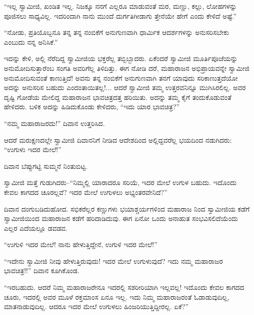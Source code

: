 “ಇಲ್ಲ ಸ್ವಾಮೀಜಿ, ಖಂಡಿತ ಇಲ್ಲ. ನಿಜಕ್ಕೂ ನನಗೆ ಎಲ್ಲರೂ ಮಾಡುವಂತೆ ಮರ, ಮಣ್ಣು, ಕಲ್ಲು, ಲೋಹಗಳನ್ನು ಪೂಜಿಸಲು ಸಾಧ್ಯವಿಲ್ಲ. ಇದರಿಂದಾಗಿ ನಾನು ಮುಂದೆ ದುರ್ಗತಿಗೀಡಾಗು ತ್ತೇನೆಯೇ ಹೇಗೆ ಎಂದು ಕೇಳಿದೆ ಅಷ್ಟೆ.”

“ನೋಡು, ಪ್ರತಿಯೊಬ್ಬನೂ ತನ್ನ ತನ್ನ ನಂಬಿಕೆಗೆ ಅನುಗುಣವಾಗಿ ಧಾರ್ಮಿಕ ಆದರ್ಶಗಳನ್ನು ಅನುಸರಿಸಬೇಕು ಎಂಬುದು ನನ್ನ ಅನಿಸಿಕೆ.”

ಇದನ್ನು ಕೇಳಿ, ಅಲ್ಲಿ ನೆರೆದಿದ್ದ ಸ್ವಾಮೀಜಿಯ ಭಕ್ತರೆಲ್ಲ ತಬ್ಬಿಬ್ಬಾದರು. ಏಕೆಂದರೆ ಸ್ವಾಮೀಜಿ ಮೂರ್ತಿಪೂಜೆಯನ್ನು ಅನುಮೋದಿಸುತ್ತಾರೆಂಬ ಸಂಗತಿ ಅವರಿಗೆಲ್ಲ ತಿಳಿದಿತ್ತು. ಈಗ ನೋಡಿ ದರೆ, ಮಹಾರಾಜನ ಅಭಿಪ್ರಾಯವನ್ನೇ ಸ್ವಾಮೀಜಿ ಅನುಮೋದಿಸುವಂತೆ ಕಾಣುತ್ತಿದೆ! ಅವನು ತನ್ನ ನಂಬಿಕೆಗೆ ಅನುಗುಣವಾಗಿ ತನಗೆ ಯಾವುದು ಸರಿಕಾಣುತ್ತದೆಯೋ ಅದನ್ನು ಅನುಸರಿಸ ಬಹುದು ಎಂದಂತಾಯಿತಲ್ಲ!... ಆದರೆ ಸ್ವಾಮೀಜಿ ತಮ್ಮ ಉತ್ತರವನಿನ್ನೂ ಮುಗಿಸಿರಲಿಲ್ಲ. ಅವರ ದೃಷ್ಟಿ ಗೋಡೆಯ ಮೇಲಿದ್ದ ಮಹಾರಾಜನ ಭಾವಚಿತ್ರದತ್ತ ಹರಿಯಿತು. ಅದನ್ನು ತಮ್ಮ ಕೈಗೆ ತಂದುಕೊಡುವಂತೆ ಹೇಳಿದರು. ಬಳಿಕ ಅದನ್ನು ಹಿಡಿದುಕೊಂಡು ಕೇಳಿದರು, “ಇದು ಯಾರ ಭಾವಚಿತ್ರ?”

“ನಮ್ಮ ಮಹಾರಾಜರದು!” ದಿವಾನ ಉತ್ತರಿಸಿದ.

ಆದರೆ ಮರುಕ್ಷಣದಲ್ಲೇ ಸ್ವಾಮೀಜಿ ದಿವಾನನಿಗೆ ನೀಡಿದ ಆದೇಶದಿಂದ ಅಲ್ಲಿದ್ದವರೆಲ್ಲ ಭಯದಿಂದ ನಡುಗಿದರು: “ಉಗುಳು ಇದರ ಮೇಲೆ!”

ದಿವಾನ ಬೆಪ್ಪುಗಟ್ಟಿ ಸುಮ್ಮನೆ ನಿಂತುಬಿಟ್ಟ.

ಸ್ವಾಮೀಜಿ ಮತ್ತೆ ಗುಡುಗಿದರು–“ನಿಮ್ಮಲ್ಲಿ ಯಾರಾದರೂ ಸರಿಯೆ, ಇದರ ಮೇಲೆ ಉಗುಳ ಬಹುದು. ಇದೊಂದು ಕೇವಲ ಕಾಗದದ ಚೂರಲ್ಲವೆ? ಇದರ ಮೇಲೆ ಉಗುಳಲು ಅಭ್ಯಂತರವೇನಿದೆ?”

ದಿವಾನ ದಂಗುಬಡಿದುಹೋದ. ಸಭಿಕರೆಲ್ಲರ ಕಣ್ಣುಗಳು ಭಯಾಶ್ಚರ್ಯಗಳಿಂದ ಮಹಾರಾಜ ನಿಂದ ಸ್ವಾಮೀಜಿಯ ಕಡೆಗೆ ಸ್ವಾಮೀಜಿಯಿಂದ ಮಹಾರಾಜನ ಕಡೆಗೆ ಹರಿದಾಡಿದುವು. ಈಗ ಏನೋ ಒಂದು ಅನಾಹುತ ಸಂಭವಿಸಲಿದೆಯೆಂದು ಎಲ್ಲರ ಎದೆಯಲ್ಲೂ ಡವಡವ.

“ಉಗುಳಿ ಇದರ ಮೇಲೆ! ನಾನು ಹೇಳುತ್ತಿದ್ದೇನೆ, ಉಗುಳಿ ಇದರ ಮೇಲೆ!”

“ಇದೇನು ಸ್ವಾಮೀಜಿ ನೀವು ಹೇಳುತ್ತಿರುವುದು! ಇದರ ಮೇಲೆ ಉಗುಳುವುದೆ? ಇದು ನಮ್ಮ ಮಹಾರಾಜರ ಭಾವಚಿತ್ರ!!” ದಿವಾನ ಕೂಗಿಕೊಂಡ.

“ಇರಬಹುದು. ಆದರೆ ನಿಮ್ಮ ಮಹಾರಾಜರೇನೂ ಇದರಲ್ಲಿ ಸಶರೀರಿಯಾಗಿ ಇಲ್ಲವಲ್ಲ! ಇದೊಂದು ಕೇವಲ ಕಾಗದದ ಚೂರು, ಇದರಲ್ಲಿ ಅವರ ಮೂಳೆ ರಕ್ತಮಾಂಸ ಏನೂ ಇಲ್ಲ. ಇದು ನಿಮ್ಮ ಮಹಾರಾಜರಂತೆ ಓಡಾಡುವುದಿಲ್ಲ, ಮಾತನಾಡುವುದಿಲ್ಲ. ಆದರೂ ಇದರ ಮೇಲೆ ಉಗುಳಲು ಹಿಂಜರಿಯುತ್ತಿದ್ದೀರಲ್ಲ. ಏಕೆ?”

